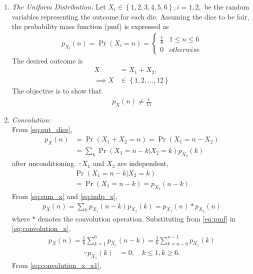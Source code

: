 \documentclass[journal,15pt,twocolumn]{IEEEtran}
\providecommand{\pr}[1]{\ensuremath{\Pr\left(#1\right)}}
\providecommand{\cbrak}[1]{\ensuremath{\left\{#1\right\}}}
\begin{document}
\begin{enumerate}
\item  {\em The Uniform Distribution: }Let $X_i \in \cbrak{1,2,3,4,5,6}, i = 1,2,$ be the random variables representing the outcome for each die.  Assuming the dice to be fair, the probability mass function (pmf) is expressed as 
\begin{align}
\label{eq:pmf}
p_{X_i}(n) = \pr{X_i = n} = 
\begin{cases}
\frac{1}{6} & 1 \le n \le 6
\\
0 & otherwise
\end{cases}
\end{align}
The desired outcome is
\begin{align}
\label{eq:out_dice}
X &= X_1 + X_2,
\\
\implies X &\in \cbrak{1,2,\dots,12}
\end{align}
%
The objective is to show that
\begin{align}
p_X(n) \ne \frac{1}{11}
\label{eq:dice_null}
\end{align}
\item {\em Convolution: }\\
From \eqref{eq:out_dice},
\begin{align}
p_X(n) &= \pr{X_1 + X_2 = n} = \pr{X_1  = n -X_2}
\\
&= \sum_{k}^{}\pr{X_1  = n -k | X_2 = k}p_{X_2}(k)
\label{eq:sum_x}
\end{align}%
after unconditioning.  $\because X_1$ and $X_2$ are independent,
\begin{multline}
\pr{X_1  = n -k | X_2 = k} 
\\
= \pr{X_1  = n -k} = p_{X_1}(n-k)
\label{eq:indp_x}
\end{multline}
From \eqref{eq:sum_x} and \eqref{eq:indp_x},
\begin{align}
p_X(n) = \sum_{k}^{}p_{X_1}(n-k)p_{X_2}(k) = p_{X_1}(n)*p_{X_2}(n)
\label{eq:convolution_x}
\end{align}
where $*$ denotes the convolution operation. 
Substituting from \eqref{eq:pmf}
in \eqref{eq:convolution_x},
\begin{align}
p_X(n) = \frac{1}{6}\sum_{k=1}^{6}p_{X_1}(n-k)= \frac{1}{6}\sum_{k=n-6}^{n-1}p_{X_1}(k)
\label{eq:convolution_x_x1}
\end{align}
\begin{align}
\because p_{X_1}(k) &= 0, \quad k \le 1, k \ge 6.
\end{align}
From \eqref{eq:convolution_x_x1},
%
\begin{align}

\end{align}
\end{enumerate}
\end{document}
